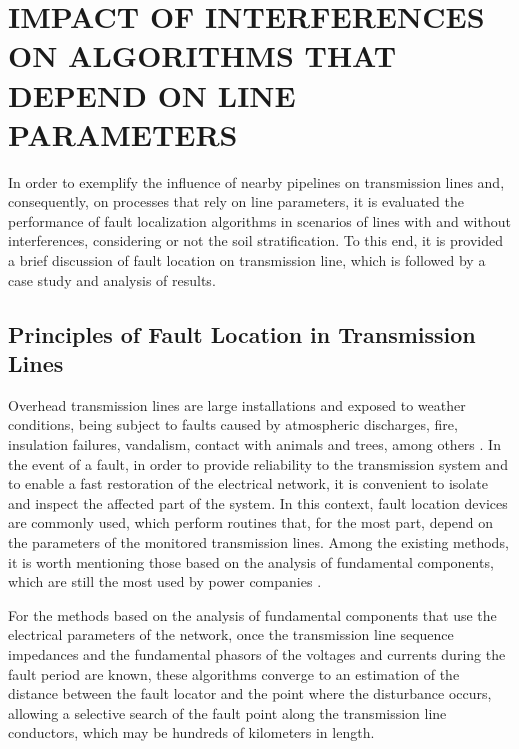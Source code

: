 \documentclass[conference]{IEEEtran}
\begin{document}
	
	\section{IMPACT OF INTERFERENCES ON ALGORITHMS THAT DEPEND ON LINE PARAMETERS}
	
	In order to exemplify the influence of nearby pipelines on transmission lines and, consequently, on processes that rely on line parameters, it is evaluated the performance of fault localization algorithms in scenarios of lines with and without interferences, considering or not the soil stratification. To this end, it is provided a brief discussion of fault location on transmission line, which is followed by a case study and analysis of results.
	
	
	\subsection{Principles of Fault Location in Transmission Lines}
	Overhead transmission lines are large installations and exposed to weather conditions, being subject to faults caused by atmospheric discharges, fire, insulation failures, vandalism, contact with animals and trees, among others \cite{Das2014}. In the event of a fault, in order to provide reliability to the transmission system and to enable a fast restoration of the electrical network, it is convenient to isolate and inspect the affected part of the system. In this context, fault location devices are commonly used, which perform routines that, for the most part, depend on the parameters of the monitored transmission lines. Among the existing methods, it is worth mentioning those based on the analysis of fundamental components, which are still the most used by power companies \cite{Das2014}.
	
	For the methods based on the analysis of fundamental components that use the electrical parameters of the network, once the transmission line sequence impedances and the fundamental phasors of the voltages and currents during the fault period are known, these algorithms converge to an estimation of the distance between the fault locator and the point where the disturbance occurs, allowing a selective search of the fault point along the transmission line conductors, which may be hundreds of kilometers in length.
	
\end{document}

